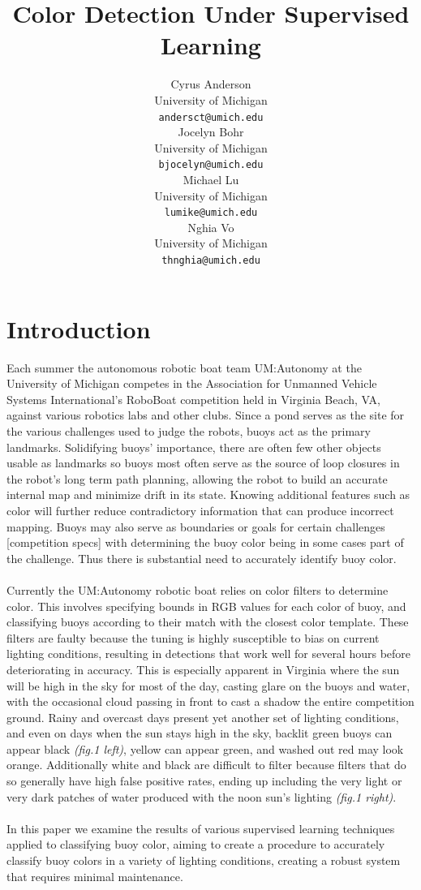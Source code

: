 \documentclass{article} %
\title{Color Detection Under Supervised Learning}
\author{
Cyrus Anderson \\
University of Michigan \\
\texttt{andersct@umich.edu} \\
\And
Jocelyn Bohr \\
University of Michigan \\
\texttt{bjocelyn@umich.edu} \\
\AND
Michael Lu \\
University of Michigan \\
\texttt{lumike@umich.edu} \\
\And
Nghia Vo \\
University of Michigan \\
\texttt{thnghia@umich.edu} \\
}
\begin{document}
\maketitle

\begin{abstract}

\end{abstract}

\section{Introduction}
Each summer the autonomous robotic boat team UM:Autonomy at the University of Michigan competes in the Association for Unmanned Vehicle Systems International's RoboBoat competition held in Virginia Beach, VA, against various robotics labs and other clubs. Since a pond serves as the site for the various challenges used to judge the robots, buoys act as the primary landmarks. Solidifying buoys' importance, there are often few other objects usable as landmarks so buoys most often serve as the source of loop closures in the robot's long term path planning, allowing the robot to build an accurate internal map and minimize drift in its state. Knowing additional features such as color will further reduce contradictory information that can produce incorrect mapping. Buoys may also serve as boundaries or goals for certain challenges [competition specs] with determining the buoy color being in some cases part of the challenge. Thus there is substantial need to accurately identify 
buoy color.
\\\\Currently the UM:Autonomy robotic boat relies on color filters to determine color. This involves specifying bounds in RGB values for each color of buoy, and classifying buoys according to their match with the closest color template. These filters are faulty because the tuning is highly susceptible to bias on current lighting conditions, resulting in detections that work well for several hours before deteriorating in accuracy. This is especially apparent in Virginia where the sun will be high in the sky for most of the day, casting glare on the buoys and water, with the occasional cloud passing in front to cast a shadow the entire competition ground. Rainy and overcast days present yet another set of lighting conditions, and even on days when the sun stays high in the sky, backlit green buoys can appear black \textit{(fig.1 left)}, yellow can appear green, and washed out red may look orange. Additionally white and black are difficult to filter because filters that do so generally have high false positive rates, ending up including the very light or very dark patches of water produced with the 
noon sun's lighting \textit{(fig.1 right)}.
\\\\In this paper we examine the results of various supervised learning techniques applied to classifying buoy color, aiming to create a procedure to accurately classify buoy colors in a variety of lighting conditions, creating a robust system that requires minimal maintenance.
\end{document}
